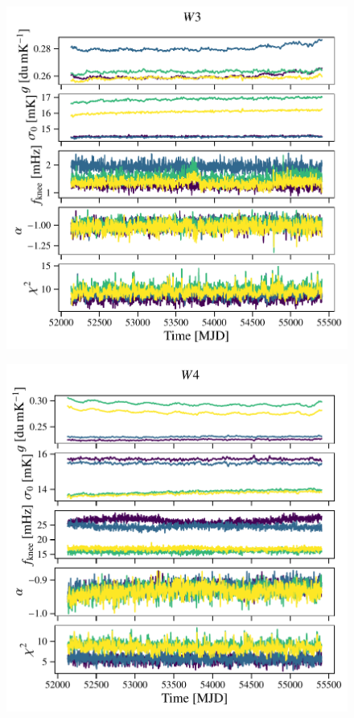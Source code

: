 \documentclass[twocolumn]{../../common/aa}
\begin{document}
\begin{figure}
	\centering
	\includegraphics[width=\columnwidth]{figures/inst_090-WMAP_W3.pdf}
\end{figure}
\begin{figure}
	\centering
	\includegraphics[width=\columnwidth]{figures/inst_090-WMAP_W4.pdf}
\end{figure}



%




\end{document}
